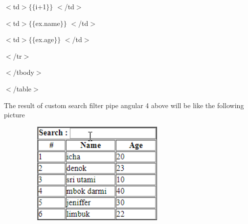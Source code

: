 \documentclass{article}
\begin{document}
$\mathrm{<}$td$\mathrm{>}$$\mathrm{\{}$$\mathrm{\{}$i+1$\mathrm{\}}$$\mathrm{\}}$ $\mathrm{<}$/td$\mathrm{>}$

$\mathrm{<}$td$\mathrm{>}$$\mathrm{\{}$$\mathrm{\{}$ex.name$\mathrm{\}}$$\mathrm{\}}$ $\mathrm{<}$/td$\mathrm{>}$

$\mathrm{<}$td$\mathrm{>}$$\mathrm{\{}$$\mathrm{\{}$ex.age$\mathrm{\}}$$\mathrm{\}}$ $\mathrm{<}$/td$\mathrm{>}$

$\mathrm{<}$/tr$\mathrm{>}$

\noindent $\mathrm{<}$/tbody$\mathrm{>}$

\noindent $\mathrm{<}$/table$\mathrm{>}$

\noindent The result of custom search filter pipe angular 4 above will be like the following picture

\begin{center}
	\noindent \includegraphics*[width=3.96in, height=1.99in]{IMG-03-09}
\end{center}
\end{document}
